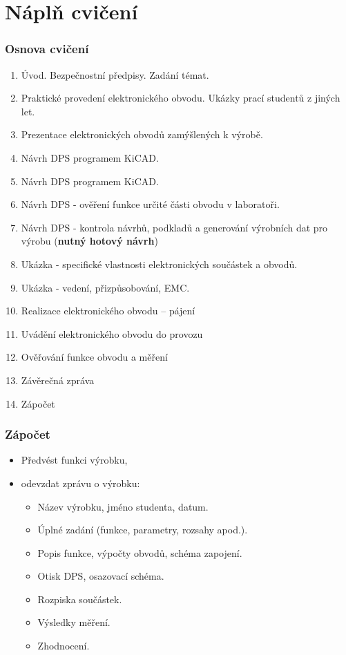 \documentclass{beamer}
\begin{document}
\section{\texorpdfstring{Náplň cvičení}{Napln Cviceni}}
  \begin{frame}
    \frametitle{Osnova cvičení}
		\begin{enumerate}
          \small
          \item Úvod. Bezpečnostní předpisy. Zadání témat.
          \item Praktické provedení elektronického obvodu. Ukázky prací studentů z jiných let.
          \item Prezentace elektronických obvodů zamýšlených k výrobě.
          \item Návrh DPS programem KiCAD.
          \item Návrh DPS programem KiCAD.
          \item Návrh DPS - ověření funkce určité části obvodu v laboratoři.
          \item Návrh DPS - kontrola návrhů, podkladů a generování výrobních dat pro výrobu (\textbf{nutný hotový návrh})
          \item Ukázka - specifické vlastnosti elektronických součástek a obvodů.
          \item Ukázka - vedení, přizpůsobování, EMC.
          \item Realizace elektronického obvodu – pájení 
          \item Uvádění elektronického obvodu do provozu
          \item Ověřování funkce obvodu a měření
          \item Závěrečná zpráva
          \item Zápočet
		\end{enumerate}
	
	\end{frame}
	\begin{frame}
    \frametitle{Zápočet}
		
		\begin{itemize}
			\item Předvést funkci výrobku,
			\item odevzdat zprávu o výrobku:
      
      \begin{itemize}
        \item Název výrobku, jméno studenta, datum.
        \item Úplné zadání (funkce, parametry, rozsahy apod.).
        \item Popis funkce, výpočty obvodů, schéma zapojení.
        \item Otisk DPS, osazovací schéma.
        \item Rozpiska součástek.
        \item Výsledky měření.
        \item Zhodnocení.
      \end{itemize}
		\end{itemize}
	
	\end{frame}
\end{document}
